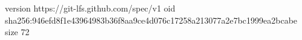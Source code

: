version https://git-lfs.github.com/spec/v1
oid sha256:946efd8f1e43964983b36f8aa9ce4d076c17258a213077a2e7bc1999ea2bcabe
size 72
